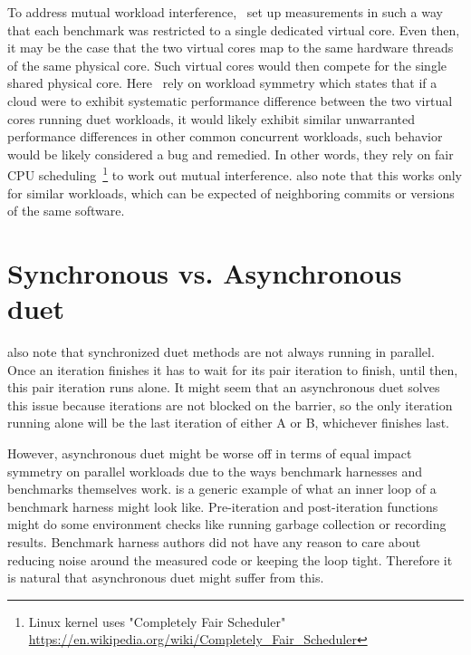 To address mutual workload interference,~\citet{bulej2020duet} set up measurements in such a way that each benchmark was restricted to a single dedicated virtual core.
Even then, it may be the case that the two virtual cores map to the same hardware threads of the same physical core.
Such virtual cores would then compete for the single shared physical core.
Here~\citet{bulej2019initial} rely on workload symmetry which states that if a cloud were to exhibit systematic performance difference between the two virtual cores running duet workloads, it would likely exhibit similar unwarranted performance differences in other common concurrent workloads, such behavior would be likely considered a bug and remedied.
In other words, they rely on fair CPU scheduling~\footnote{Linux kernel uses "Completely Fair Scheduler" \url{https://en.wikipedia.org/wiki/Completely_Fair_Scheduler}} to work out mutual interference.
\citet{bulej2019initial} also note that this works only for similar workloads, which can be expected of neighboring commits or versions of the same software.


\section{Synchronous vs. Asynchronous duet}

 also note that synchronized duet methods are not always running in parallel.
Once an iteration finishes it has to wait for its pair iteration to finish, until then, this pair iteration runs alone.
It might seem that an asynchronous duet solves this issue because iterations are not blocked on the barrier, so the only iteration running alone will be the last iteration of either A or B, whichever finishes last.

However, asynchronous duet might be worse off in terms of equal impact symmetry on parallel workloads due to the ways benchmark harnesses and benchmarks themselves work.
 is a generic example of what an inner loop of a benchmark harness might look like.
Pre-iteration and post-iteration functions might do some environment checks like running garbage collection or recording results.
Benchmark harness authors did not have any reason to care about reducing noise around the measured code or keeping the loop tight.
Therefore it is natural that asynchronous duet might suffer from this.

